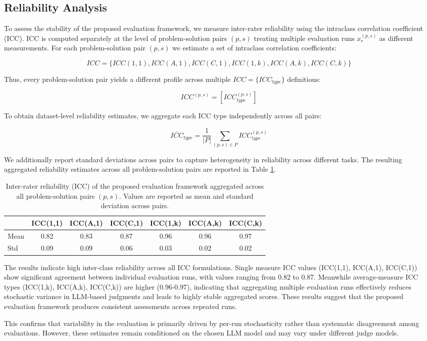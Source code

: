 \subsection{Reliability Analysis}

To assess the stability of the proposed evaluation framework, we measure inter-rater reliability using the intraclass correlation coefficient (ICC). ICC is computed separately at the level of problem-solution pairs $(p,s)$ treating multiple evaluation runs $x_r^{(p, s)}$ as different measurements. For each problem-solution pair $(p,s)$ we estimate a set of intraclass correlation coefficients:

\[
ICC = \{ICC(1,1), ICC(A,1), ICC(C,1), ICC(1,k), ICC(A,k), ICC(C,k)\}
\]

Thus, every problem-solution pair yields a different profile across multiple $ICC = \{ICC_{type}\}$ definitions:

\[
ICC^{(p,s)} = [ICC_{type}^{(p,s)}]
\]

To obtain dataset-level reliability estimates, we aggregate each ICC type independently across all pairs:

\[
\overline{ICC}_{type} = \frac{1}{|P|} \sum_{(p,s) \in P} ICC^{(p,s)}_{type}
\]

We additionally report standard deviations across pairs to capture heterogeneity in reliability across different tasks. 
The resulting aggregated reliability estimates across all problem-solution pairs are reported in Table \ref{table:reliability_analysis}.

\begin{table}[h]
\centering
\begin{tabular}{lcccccc}
\hline
 & ICC(1,1) & ICC(A,1) & ICC(C,1) & ICC(1,k) & ICC(A,k) & ICC(C,k) \\
\hline
Mean & 0.82 & 0.83 & 0.87 & 0.96 & 0.96 & 0.97 \\
Std  & 0.09 & 0.09 & 0.06 & 0.03 & 0.02 & 0.02 \\
\hline
\end{tabular}
\caption{Inter-rater reliability (ICC) of the proposed evaluation framework aggregated across all problem-solution pairs $(p,s)$. Values are reported as mean and standard deviation across pairs.}
\label{table:reliability_analysis}
\end{table}

The results indicate high inter-class reliability across all ICC formulations.
Single measure ICC values (ICC(1,1), ICC(A,1), ICC(C,1)) show significant agreement between individual evaluation runs, with values ranging from 0.82 to 0.87. 
Meanwhile average-measure ICC types (ICC(1,k), ICC(A,k), ICC(C,k)) are higher (0.96-0.97), indicating that aggregating multiple evaluation runs effectively reduces stochastic variance in LLM-based judgments and leads to highly stable aggregated scores. 
These results suggest that the proposed evaluation framework produces consistent assessments across repeated runs.

This confirms that variability in the evaluation is primarily driven by per-run stochasticity rather than systematic disagreement among evaluations. However, these estimates remain conditioned on the chosen LLM model and may vary under different judge models.